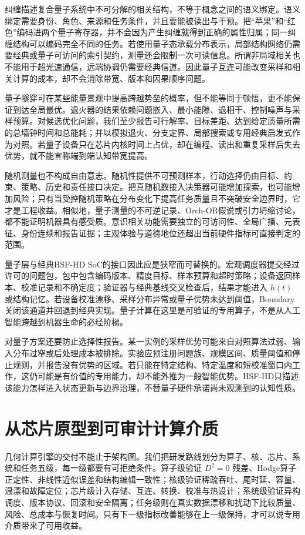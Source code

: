 纠缠描述复合量子系统中不可分解的相关结构，不等于概念之间的语义绑定。语义绑定需要身份、角色、来源和任务条件，并且要能被读出与干预。把“苹果”和“红色”编码进两个量子寄存器，并不会因为产生纠缠就得到正确的属性归属；同一纠缠结构可以编码完全不同的任务。若使用量子态承载分布表示，局部结构网络仍需要经典或量子可访问的索引契约，测量还会限制一次可读信息。所谓非局域相关也不能用于超光速通信，远端协调仍需要经典信道。因此量子互连可能改变采样和相关计算的成本，却不会消除带宽、版本和因果顺序问题。

量子隧穿可在某些能量景观中提高跨越势垒的概率，但不能等同于顿悟，更不能保证到达全局最优。退火器的结果依赖问题嵌入、最小能隙、退相干、控制噪声与采样预算。对候选优化问题，我们至少报告可行解率、目标差距、达到给定质量所需的总墙钟时间和总能耗；并以模拟退火、分支定界、局部搜索或专用经典启发式作为对照。若量子设备只在芯片内核时间上占优，却在编程、读出和重复采样后失去优势，就不能宣称端到端认知带宽提高。

随机测量也不构成自由意志。随机性提供不可预测样本，行动选择仍由目标、约束、策略、历史和责任接口决定。把真随机数接入决策器可能增加探索，也可能增加风险；只有当受控随机策略在分布变化下提高任务质量且不突破安全边界时，它才是工程收益。相似地，量子测量的不可逆记录、Orch-OR假说或引力坍缩讨论，都不能证明机器具有感受质。意识相关功能需要独立的可访问性、全局广播、元表征、身份连续和报告证据；主观体验与道德地位还超出当前硬件指标可直接判定的范围。

量子层与经典HSF-HD SoC的接口因此应是狭窄而可替换的。宏观调度器提交经过许可的问题包，包中包含编码版本、精度目标、样本预算和超时策略；设备返回样本、校准记录和不确定度；验证器与经典基线交叉检查后，结果才能进入 $h(t)$ 或结构记忆。若设备校准漂移、采样分布异常或量子优势未达到阈值，Boundary关闭该通道并回退到经典实现。量子计算在这里是可验证的专用算子，不是从人工智能跨越到机器生命的必经阶梯。

对量子方案还要防止选择性报告。某一实例的采样优势可能来自对照算法过弱、输入分布过窄或后处理成本被排除。实验应预注册问题族、规模区间、质量阈值和停止规则，并报告没有优势的区域。若只能在特定结构、特定温度和短校准窗口内工作，这仍可能是有价值的专用能力，却不能外推为一般智能优势。HSF-HD只描述该能力怎样进入状态更新与边界治理，不替量子硬件承诺尚未观测到的认知性质。

\section{从芯片原型到可审计计算介质}
\label{sec:section_1491}

几何计算引擎的交付不能止于架构图。我们把研发路线划分为算子、核、芯片、系统和任务五级，每一级都要有可拒绝条件。算子级验证 $D^2=0$ 残差、Hodge算子正定性、非线性近似误差和结构编辑一致性；核级验证稀疏吞吐、尾时延、容量、温漂和故障定位；芯片级计入存储、互连、转换、校准与热设计；系统级验证异构调度、版本协议、回滚和安全隔离；任务级则在真实数据漂移和扰动下比较质量、风险、总成本与恢复时间。只有下一级指标改善能够在上一级保持，才可以说专用介质带来了可用收益。

